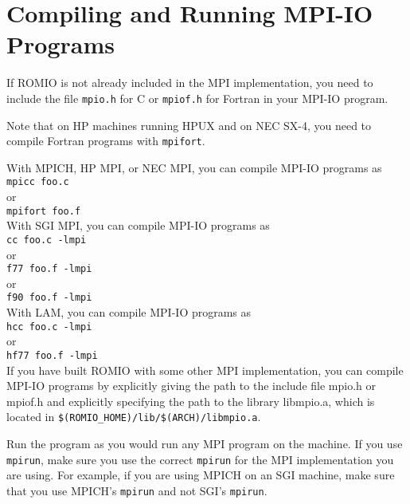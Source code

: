 %
%
\section{Compiling and Running MPI-IO Programs}
If ROMIO is not already included in the MPI implementation, you need
to include the file {\tt mpio.h} for C or {\tt mpiof.h} for Fortran in
your MPI-IO program.  

Note that on HP machines running HPUX and on NEC SX-4, you need to
compile Fortran programs with {\tt mpifort}.

With MPICH, HP MPI, or NEC MPI, you can compile MPI-IO programs as \\
\hspace*{.4in} {\tt mpicc foo.c}\\
or \\
\hspace*{.4in} {\tt mpifort foo.f}\\

With SGI MPI, you can compile MPI-IO programs as \\
\hspace*{.4in} {\tt cc foo.c -lmpi}\\
or \\
\hspace*{.4in} {\tt f77 foo.f -lmpi}\\
or \\
\hspace*{.4in} {\tt f90 foo.f -lmpi}\\

With LAM, you can compile MPI-IO programs as \\
\hspace*{.4in} {\tt hcc foo.c -lmpi}\\
or \\
\hspace*{.4in} {\tt hf77 foo.f -lmpi}\\

If you have built ROMIO with some other MPI implementation, you can
compile MPI-IO programs by explicitly giving the path to the include
file mpio.h or mpiof.h and explicitly specifying the path to the
library libmpio.a, which is located in {\tt \$(ROMIO\_HOME)/lib/\$(ARCH)/libmpio.a}.

Run the program as you would run any MPI program on the machine.
If you use {\tt mpirun}, make sure you use the correct {\tt mpirun}
for the MPI implementation you are using. For example, if you
are using MPICH on an SGI machine, make sure that you use MPICH's
{\tt mpirun} and not SGI's {\tt mpirun}.


